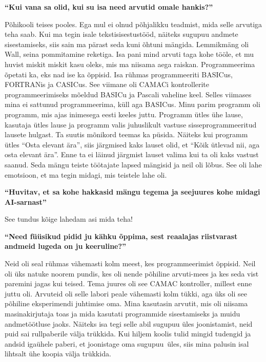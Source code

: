 \textbf{\enquote{Kui vana sa olid, kui su isa need arvutid omale hankis?}}

Põhikooli teises pooles. Ega mul ei olnud põhjalikku teadmist, mida selle arvutiga teha saab. Kui ma tegin isale tekstisisestustööd, näiteks sugupuu andmete sisestamiseks, siis sain ma pärast seda kuni õhtuni mängida. Lemmikmäng oli Wall, seina pommitamine reketiga. Isa pani mind arvuti taga kohe tööle, et mu huvist miskit miskit kasu oleks, mis ma niisama aega raiskan. Programmeerima õpetati ka, eks nad ise ka õppisid. Isa rühmas programmeeriti BASICus, FORTRANis ja CASICus. See viimane oli CAMACi kontrollerite programmeerimiseks mõeldud BASICu ja Pascali vaheline keel. Selles viimases mina ei sattunud programmeerima, küll aga BASICus. Minu parim programm oli programm, mis ajas inimesega eesti keeles juttu. Programm ütles ühe lause, kasutaja ütles lause ja programm valis juhuslikult vastuse sisseprogrammeeritud lausete hulgast. Ta suutis mõnikord teemas ka püsida. Näiteks kui programm ütles \enquote{Osta elevant ära}, siis järgmised kaks lauset olid, et \enquote{Kõik ütlevad nii, aga osta elevant ära}. Enne ta ei läinud järgmist lauset valima kui ta oli kaks vastust saanud. Seda mängu teiste töötajate lapsed mängisid ja neil oli lõbus. See oli lahe emotsioon, et ma tegin midagi, mis teistele lahe oli. 

\textbf{\enquote{Huvitav, et sa kohe hakkasid mängu tegema ja seejuures kohe midagi AI-sarnast}}

See tundus kõige lahedam asi mida teha! 

\textbf{\enquote{Need füüsikud pidid ju kähku õppima, sest reaalajas riistvarast andmeid lugeda on ju keeruline?}}

Neid oli seal rühmas vähemasti kolm meest, kes programmeerimist õppisid. Neil oli üks natuke noorem pundis, kes oli nende põhiline arvuti-mees ja kes seda vist paremini jagas kui teised. Tema juures oli see CAMAC kontroller, millest enne juttu oli. Arvuteid oli selle labori peale vähemasti kolm tükki, aga üks oli see põhiline eksperimendi juhtimise oma. Mina kasutasin arvutit, mis oli niisama masinakirjutaja toas ja mida kasutati programmide sisestamiseks ja muidu andmetöötluse jaoks. Näiteks isa tegi selle abil sugupuu üles joonistamist, neid puid sai rullpaberile välja trükkida. Kui hiljem koolis tulid mingid tudengid ja andsid igaühele paberi, et joonistage oma sugupuu üles, siis mina palusin isal lihtsalt ühe koopia välja trükkida.

